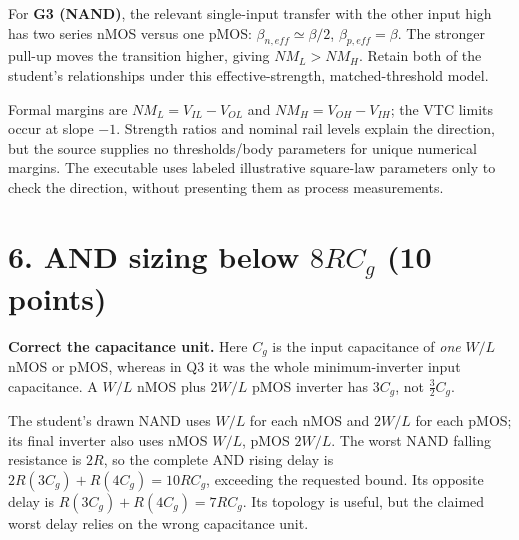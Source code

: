 \documentclass[10pt]{article}
\begin{document}
For \textbf{G3 (NAND)}, the relevant single-input transfer with the other input high has two series nMOS versus one pMOS: $\beta_{n,eff}\simeq\beta/2$, $\beta_{p,eff}=\beta$. The stronger pull-up moves the transition higher, giving $\boxed{NM_L>NM_H}$. Retain both of the student's relationships under this effective-strength, matched-threshold model.

Formal margins are $NM_L=V_{IL}-V_{OL}$ and $NM_H=V_{OH}-V_{IH}$; the VTC limits occur at slope $-1$. Strength ratios and nominal rail levels explain the direction, but the source supplies no thresholds/body parameters for unique numerical margins. The executable uses labeled illustrative square-law parameters only to check the direction, without presenting them as process measurements.

\section*{6. AND sizing below $8RC_g$ (10 points)}
\textbf{Correct the capacitance unit.} Here $C_g$ is the input capacitance of \emph{one} $W/L$ nMOS or pMOS, whereas in Q3 it was the whole minimum-inverter input capacitance. A $W/L$ nMOS plus $2W/L$ pMOS inverter has $3C_g$, not $\tfrac32C_g$.

The student's drawn NAND uses $W/L$ for each nMOS and $2W/L$ for each pMOS; its final inverter also uses nMOS $W/L$, pMOS $2W/L$. The worst NAND falling resistance is $2R$, so the complete AND rising delay is $2R(3C_g)+R(4C_g)=10RC_g$, exceeding the requested bound. Its opposite delay is $R(3C_g)+R(4C_g)=7RC_g$. Its topology is useful, but the claimed worst delay relies on the wrong capacitance unit.
\end{document}
